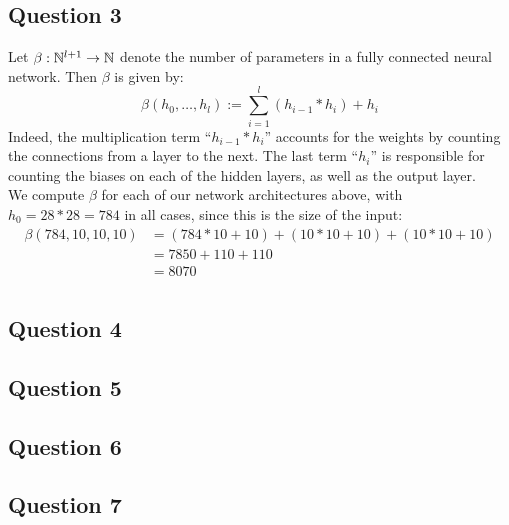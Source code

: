 \documentclass[12pt]{article}
\begin{document}
\subsection{Question 3}
Let $\beta: \mathbb{N}^{l+1} \to \mathbb{N}$ denote the number of parameters in a fully connected neural network. Then $\beta$ is given by:
\begin{equation}
    \beta(h_0, \ldots, h_l) := \sum_{i=1}^{l} (h_{i-1} * h_{i}) + h_i
\end{equation}
Indeed, the multiplication term ``$h_{i-1} * h_{i}$'' accounts for the weights by counting the connections from a layer to the next.
The last term ``$h_i$'' is responsible for counting the biases on each of the hidden layers, as well as the output layer. \\
We compute $\beta$ for each of our network architectures above, with $h_0 = 28 * 28 = 784$ in all cases, since this is the size of the input:
\begin{align*}
    \beta(784, 10, 10, 10)
     & = (784 * 10 + 10) + (10 * 10 + 10) + (10 * 10 + 10) \\
     & = 7850 + 110 + 110                                  \\
     & = 8070                                              \\
\end{align*}


\subsection{Question 4}

\subsection{Question 5}

\subsection{Question 6}

\subsection{Question 7}
\end{document}
